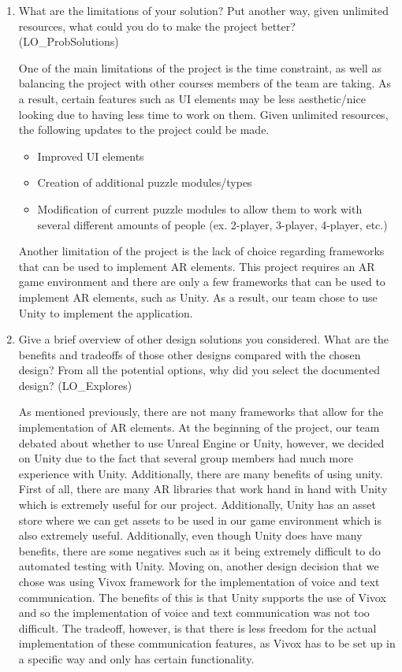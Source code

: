 \documentclass[12pt, titlepage]{article}
\begin{document}
\begin{enumerate}
  \item What are the limitations of your solution?  Put another way, given
  unlimited resources, what could you do to make the project better? (LO\_ProbSolutions)

One of the main limitations of the project is the time constraint, as well as balancing the project with other courses members of the team are taking. As a result, certain features such as UI elements may be less aesthetic/nice looking due to having less time to work on them. Given unlimited resources, the following updates to the project could be made.

\begin{itemize}
    \item Improved UI elements
    \item Creation of additional puzzle modules/types
    \item Modification of current puzzle modules to allow them to work with several different amounts of people (ex. 2-player, 3-player, 4-player, etc.)
\end{itemize}

Another limitation of the project is the lack of choice regarding frameworks that can be used to implement AR elements. This project requires an AR game environment and there are only a few frameworks that can be used to implement AR elements, such as Unity. As a result, our team chose to use Unity to implement the application.
  
  \item Give a brief overview of other design solutions you considered.  What
  are the benefits and tradeoffs of those other designs compared with the chosen
  design?  From all the potential options, why did you select the documented design?
  (LO\_Explores)

As mentioned previously, there are not many frameworks that allow for the implementation of AR elements. At the beginning of the project, our team debated about whether to use Unreal Engine or Unity, however, we decided on Unity due to the fact that several group members had much more experience with Unity. Additionally, there are many benefits of using unity. First of all, there are many AR libraries that work hand in hand with Unity which is extremely useful for our project. Additionally, Unity has an asset store where we can get assets to be used in our game environment which is also extremely useful. Additionally, even though Unity does have many benefits, there are some negatives such as it being extremely difficult to do automated testing with Unity. Moving on, another design decision that we chose was using Vivox framework for the implementation of voice and text communication. The benefits of this is that Unity supports the use of Vivox and so the implementation of voice and text communication was not too difficult. The tradeoff, however, is that there is less freedom for the actual implementation of these communication features, as Vivox has to be set up in a specific way and only has certain functionality.
\end{enumerate}
\end{document}
